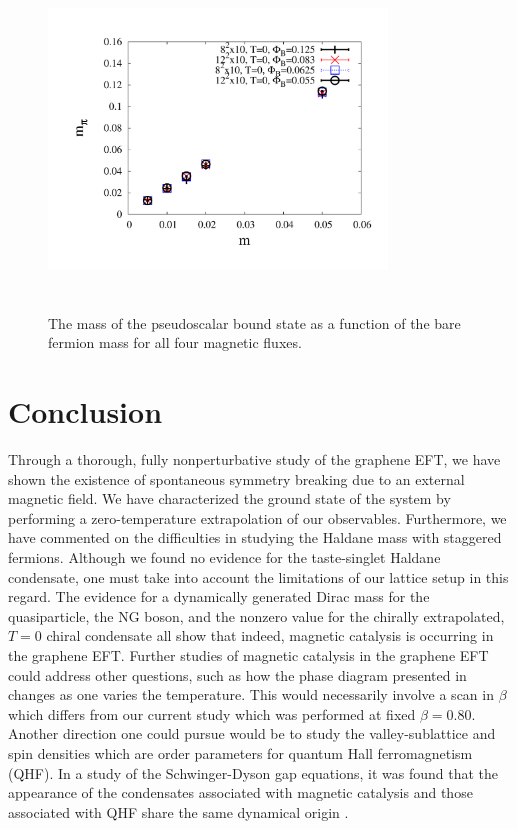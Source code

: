 \documentclass[aps,prd,twocolumn,showpacs,superscriptaddress,groupedaddress]{revtex4}  %
\begin{document}
\begin{figure}
\vspace{-1.2cm}
  \includegraphics[height=9cm,width=9cm]{ps_mt_vs_m_2exp_graphene_paper.pdf} 
  \vspace{-1.25cm}
\caption{The mass of the pseudoscalar bound state as a function of the bare fermion mass for all four magnetic fluxes.}
\label{MPSvsm}
\end{figure}

\section{\label{sec:Conclusion}Conclusion}

Through a thorough, fully nonperturbative study of the graphene EFT, we have shown the existence of spontaneous symmetry breaking due to an external magnetic field.
We have characterized the ground state of the system by performing a zero-temperature extrapolation of our observables. Furthermore, we have commented on the difficulties in studying 
the Haldane mass with staggered fermions. Although we found no evidence for the taste-singlet Haldane condensate, one must take into account the limitations of our lattice setup in this regard. The evidence for a dynamically generated Dirac mass for the quasiparticle, the NG boson, and the nonzero value for the chirally extrapolated, $T=0$ chiral condensate all show
that indeed, magnetic catalysis is occurring in the graphene EFT. Further studies of magnetic catalysis in the graphene EFT could address other questions, such as how the phase diagram presented in \cite{Polikarpov} changes as one varies the temperature.
This would necessarily involve a scan in $\beta$ which differs from our current study which was performed at fixed $\beta=0.80$. Another direction one could pursue would be to 
study the valley-sublattice and spin densities which are order parameters for quantum Hall ferromagnetism (QHF). In a study of the Schwinger-Dyson gap equations, it was found that 
the appearance of the condensates associated with magnetic catalysis and those associated with QHF share the same dynamical origin \cite{MiranskyGraphene2}.
\end{document}
